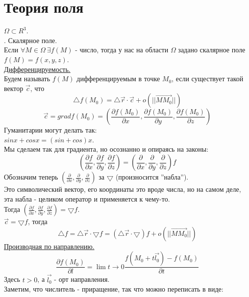 \documentclass[12pt]{article}
\begin{document}
\section{Теория поля}
$\Omega \subset R^3$.\\
. Скалярное поле.\\
Если $\forall M \in \Omega \ \exists f(M)$ - число, тогда у нас на области $\Omega$ задано скалярное поле $f(M) = f(x,y,z)$.\\
\uline{Дифференцируемость.}\\
Будем называть $f(M)$ дифференцируемым в точке $M_0$, если существует такой вектор $\overrightarrow{c}$, что\\
$${\bigtriangleup f}(M_0) = {\bigtriangleup \overrightarrow{r}} \cdot \overrightarrow{c} + o(||\overrightarrow{MM_0}||)$$
$$\overrightarrow{c} = grad f(M_0) = (\frac{\partial f(M_0)}{\partial x}, \frac{\partial f(M_0)}{\partial y}, \frac{\partial f(M_0)}{\partial z})$$
Гуманитарии могут делать так:\\
$sinx + cosx = (sin+cos)x$.\\
Мы сделаем так для градиента, но осознанно и опираясь на законы:\\
$$(\frac{\partial f}{\partial x},\frac{\partial f}{\partial y}, \frac{\partial f}{\partial z}) = (\frac{\partial}{\partial x},\frac{\partial}{\partial y},\frac{\partial}{\partial z})f$$
Обозначим теперь $(\frac{\partial}{\partial x},\frac{\partial}{\partial y},\frac{\partial}{\partial z})$ за $\bigtriangledown$ (произносится ''набла'').\\
Это символический вектор, его координаты это вроде числа, но на самом деле, эта набла - целиком оператор и применяется к чему-то.\\
Тогда $(\frac{\partial f}{\partial x},\frac{\partial f}{\partial y}, \frac{\partial f}{\partial z}) = {\bigtriangledown f}$.\\
$\overrightarrow{c} = {\bigtriangledown f}$, тогда\\
$${\bigtriangleup f} = {\bigtriangleup \overrightarrow{r}} \cdot {\bigtriangledown f} = ({\bigtriangleup \overrightarrow{r}} \cdot {\bigtriangledown})f + o(||\overrightarrow{MM_0}||)$$
\uline{Производная по направлению.}\\
$$\frac{\partial f (M_0)}{\partial l} = \lim{t\to 0} \frac{f(M_0+t\overrightarrow{l_0})-f(M_0)}{\partial t}$$
Здесь $t > 0$, а $\overrightarrow{l_0}$ - орт направления.\\
Заметим, что числитель - приращение, так что можно переписать в виде:\\
\end{document}
